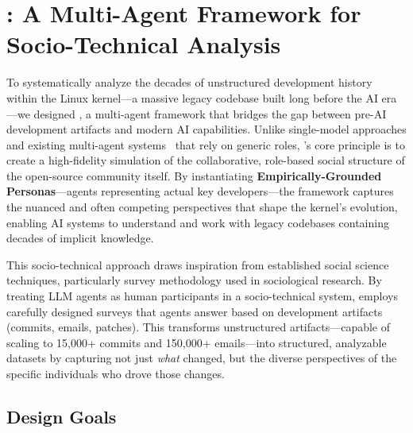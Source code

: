 
\section{\sys: A Multi-Agent Framework for Socio-Technical Analysis}

To systematically analyze the decades of unstructured development history within the Linux kernel—a massive legacy codebase built long before the AI era—we designed \sys, a multi-agent framework that bridges the gap between pre-AI development artifacts and modern AI capabilities. Unlike single-model approaches and existing multi-agent systems~\cite{lmase2024,agent4se2024} that rely on generic roles, \sys's core principle is to create a high-fidelity simulation of the collaborative, role-based social structure of the open-source community itself. By instantiating \textbf{Empirically-Grounded Personas}—agents representing actual key developers—the framework captures the nuanced and often competing perspectives that shape the kernel's evolution, enabling AI systems to understand and work with legacy codebases containing decades of implicit knowledge.

This socio-technical approach draws inspiration from established social science techniques, particularly survey methodology used in sociological research. By treating LLM agents as human participants in a socio-technical system, \sys employs carefully designed surveys that agents answer based on development artifacts (commits, emails, patches). This transforms unstructured artifacts—capable of scaling to 15,000+ commits and 150,000+ emails—into structured, analyzable datasets by capturing not just \emph{what} changed, but the diverse perspectives of the specific individuals who drove those changes.

\subsection{Design Goals}

